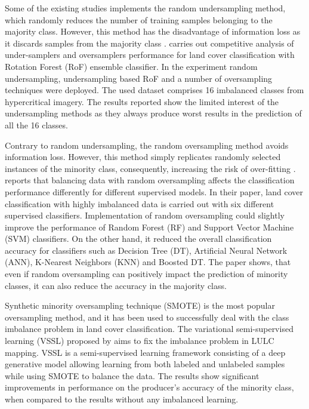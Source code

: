 \documentclass[parskip=full]{scrartcl}
\begin{document}
Some of the existing studies implements the random undersampling method, which
randomly reduces the number of training samples  belonging to the majority
class. However, this method has the disadvantage of information loss as it
discards samples from the majority class  \cite{Feng2019}. \cite{Feng2018}
carries out competitive analysis of under-samplers and oversamplers performance
for land cover classification with  Rotation Forest (RoF) ensemble classifier.
In the experiment random  undersampling, undersampling based RoF and a number of
oversampling techniques  were deployed. The used dataset comprises 16 imbalanced
classes from  hypercritical imagery. The results reported show the limited
interest of the  undersampling methods as they always produce worst results in
the prediction of all the 16 classes.

Contrary to random undersampling, the random oversampling method avoids
information loss. However, this method simply replicates randomly selected
instances of the minority class, consequently, increasing the risk of
over-fitting \cite{Krawczyk2016}. \cite{Maxwell2018} reports that balancing data
with random oversampling affects the classification performance differently for
different supervised models. In their paper, land cover classification with
highly imbalanced data is carried out with six different supervised classifiers.
Implementation of random oversampling could slightly improve the performance of
Random Forest (RF) and Support Vector Machine (SVM) classifiers. On the other
hand, it reduced the overall classification accuracy for classifiers such as
Decision Tree (DT), Artificial Neural Network (ANN), K-Nearest Neighbors (KNN)
and Boosted DT. The paper shows, that even if random oversampling can positively
impact the prediction of minority classes, it can also reduce the accuracy in
the majority class.

Synthetic minority oversampling technique (SMOTE) \cite{Chawla2002} is the most
popular oversampling method, and it has been used to successfully deal with the
class imbalance problem in land cover classification. The variational
semi-supervised learning (VSSL) proposed by \cite{Cenggoro2018} aims to fix the
imbalance problem in LULC mapping. VSSL is a semi-supervised learning framework
consisting of a deep generative model allowing learning from both labeled and
unlabeled samples while using SMOTE to balance the data. The results show
significant improvements in performance on the producer’s accuracy of the
minority class, when compared to the results without any imbalanced learning.
\end{document}

